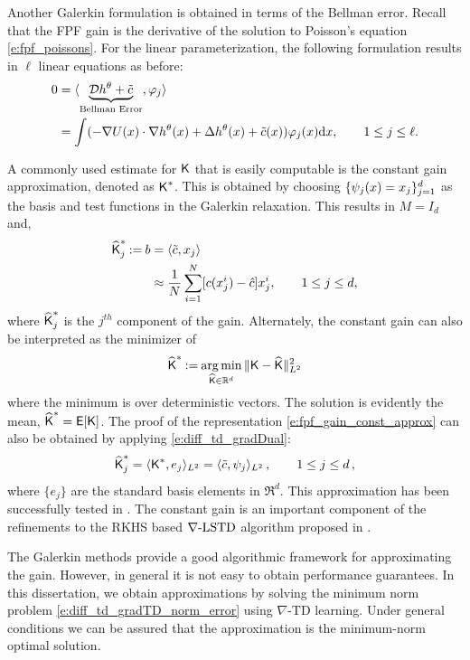Another Galerkin formulation is obtained in terms of the Bellman error. Recall that the FPF gain is the derivative of the solution to Poisson's equation \eqref{e:fpf_poissons}. For the linear parameterization, the following formulation results in $\ell$ linear equations as before:
\begin{equation}
\begin{aligned}
0 &= \langle \underbrace{\clD h^\param+\tilc}_{\text{Bellman Error}}, \test_{j} \rangle \\
&= \int (-\nabla U(x) \cdot \nabla h^\param(x)+ \Delta h^\param(x)+\tilc (x))\test_{j}(x) \ud x,  \qquad  1\leq j \leq \ell.
\end{aligned}
\label{e:fpf_galerkin_be}
\end{equation}

A commonly used estimate for $\text{\sf K}$ that is easily computable is the constant gain approximation, denoted as $\text{\sf K}^*$. This is obtained by choosing $\{\psi_j(x) = x_j\}_{j=1}^d$ as the basis and test functions in the Galerkin relaxation. This results in  $M = I_{d}$ and,
\begin{align}
\hakFPF^*_j \eqdef b & = \langle \tilc , x_j \rangle \\ 
& \approx \frac{1}{N} \sum_{i=1}^N [ c(x^i_j) - \hac ]x^i_j, \qquad 1 \leq j \leq d,
\label{e:fpf_gain_const_approx}
\end{align}
where $\widehat{\text{\sf K}}^*_j$ is the $j^{th}$ component of the gain.
Alternately, the constant gain can also be interpreted as the minimizer of 
  \begin{equation}
  \hakFPF^* \eqdef \argmin_{\hakFPF \in \Re^d} \| \kFPF - \hakFPF \|^2_{L^{2}}
  \label{e:fpf_const}
  \end{equation}
  where the minimum is over deterministic vectors. The solution is evidently the mean,  $\widehat{\text{\sf K}}^* = {\sf E}[\text{\sf K}]$.
The proof of the representation \eqref{e:fpf_gain_const_approx} can also be obtained by applying \eqref{e:diff_td_gradDual}: 
\[
\widehat{\text{\sf K}}^*_ j =  \langle \text{\sf K}^* ,e_j \rangle_{L^2}
=
\langle \tilde c ,\psi_j \rangle_{L^2}\,, \qquad 1\le j\le d\,,
\]
where $\{e_j\}$ are the standard basis elements in $\Re^d$. This approximation has been successfully tested in \cite{tilghiomeh13}. The constant gain is an important component of the refinements to the RKHS based $\nabla\text{-LSTD}$ algorithm proposed in .

The Galerkin methods provide a good algorithmic framework for approximating the gain. However, in general it is not easy to obtain performance guarantees. In this dissertation, we obtain approximations by solving  the minimum norm problem \eqref{e:diff_td_gradTD_norm_error} using $\nabla$-TD learning.  Under general conditions we can be assured that the approximation is the minimum-norm optimal solution.   


